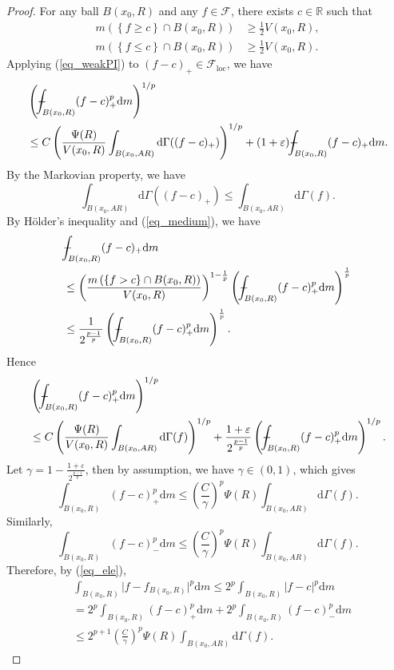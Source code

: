 \documentclass[10pt,a4paper]{amsart}
\numberwithin{equation}{section}
\def\Xint#1{\mathchoice
{\XXint\displaystyle\textstyle{#1}}%
{\XXint\textstyle\scriptstyle{#1}}%
{\XXint\scriptstyle\scriptscriptstyle{#1}}%
{\XXint\scriptscriptstyle\scriptscriptstyle{#1}}%
\!\int}
\def\XXint#1#2#3{{\setbox0=\hbox{$#1{#2#3}{\int}$ }
\vcenter{\hbox{$#2#3$ }}\kern-.6\wd0}}
\def\dashint{\Xint-}
\begin{document}
\begin{proof}
For any ball $B(x_0,R)$ and any $f\in \mathcal{F}$, there exists $c\in \mathbb{R}$ such that
\begin{equation}\label{eq_medium}
\begin{aligned}
m \left(\left\{f\ge c\right\}\cap B(x_0,R)\right)&\ge \frac{1}{2}V(x_0,R),\\
m \left(\left\{f\le c\right\}\cap B(x_0,R)\right)&\ge \frac{1}{2}V(x_0,R).
\end{aligned}
\end{equation}
Applying (\ref{eq_weakPI}) to $(f-c)_+\in \mathcal{F}_{\mathrm{loc}}$, we have
\begin{align*}
&\left(\dashint_{B(x_0,R)}(f-c)_+^p \mathrm{d}m\right)^{1/p}\\
&\le C\left(\frac{\Psi(R)}{V(x_0,R)}\int_{B(x_0,AR)} \mathrm{d}\Gamma((f-c)_+)\right)^{1/p}+(1+\varepsilon) \dashint_{B(x_0,R)}(f-c)_+ \mathrm{d}m.
\end{align*}
By the Markovian property, we have
$$\int_{B(x_0,AR)} \mathrm{d}\Gamma((f-c)_+)\le \int_{B(x_0,AR)} \mathrm{d}\Gamma(f).$$
By H\"older's inequality and (\ref{eq_medium}), we have
\begin{align*}
&\dashint_{B(x_0,R)}(f-c)_+ \mathrm{d}m\\
&\le \left(\frac{m \left(\left\{f>c\right\}\cap B(x_0,R)\right)}{V(x_0,R)}\right)^{1-\frac{1}{p}} \left(\dashint_{B(x_0,R)}(f-c)_+^p \mathrm{d}m\right)^{\frac{1}{p}}\\
&\le \frac{1}{2^{\frac{p-1}{p}}}\left(\dashint_{B(x_0,R)}(f-c)_+^p \mathrm{d}m\right)^{\frac{1}{p}}.
\end{align*}
Hence
\begin{align*}
&\left(\dashint_{B(x_0,R)}(f-c)_+^p \mathrm{d}m\right)^{1/p}\\
&\le C\left(\frac{\Psi(R)}{V(x_0,R)}\int_{B(x_0,AR)} \mathrm{d}\Gamma(f)\right)^{1/p}+\frac{1+\varepsilon}{2^{\frac{p-1}{p}}}\left(\dashint_{B(x_0,R)}(f-c)_+^p \mathrm{d}m\right)^{{1}/{p}}.
\end{align*}
Let $\gamma=1-\frac{1+\varepsilon}{2^{\frac{p-1}{p}}}$, then by assumption, we have $\gamma\in(0,1)$, which gives
$$\int_{B(x_0,R)}(f-c)_+^p \mathrm{d}m\le \left(\frac{C}{\gamma}\right)^p{\Psi(R)}\int_{B(x_0,AR)} \mathrm{d}\Gamma(f).$$
Similarly,
$$\int_{B(x_0,R)}(f-c)_-^p \mathrm{d}m\le \left(\frac{C}{\gamma}\right)^p{\Psi(R)}\int_{B(x_0,AR)} \mathrm{d}\Gamma(f).$$
Therefore, by (\ref{eq_ele}),
\begin{align*}
&\int_{B(x_0,R)} \lvert f-f_{B(x_0,R)}\rvert^p \mathrm{d}m\le 2^p\int_{B(x_0,R)} \lvert f-c\rvert^p \mathrm{d}m\\
&=2^p\int_{B(x_0,R)} (f-c)_+^p \mathrm{d}m+2^p\int_{B(x_0,R)} (f-c)_-^p \mathrm{d}m\\
&\le 2^{p+1}\left(\frac{C}{\gamma}\right)^p{\Psi(R)}\int_{B(x_0,AR)} \mathrm{d}\Gamma(f).
\end{align*}
\end{proof}
\end{document}
